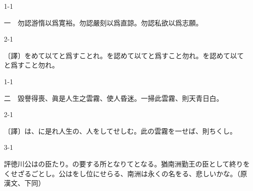 \documentclass[tate,paper=b6j,jafontsize=9pt]{jlreq}
\begin{document}
\thispagestyle{empty}
\vspace*{\fill}
\zw
{}
\vfill
\newpage

\begin{azconvIndented}{1\zw}{-1\zw}

一　勿認游惰以爲寛裕。勿認嚴刻以爲直諒。勿認私欲以爲志願。

\end{azconvIndented}
\begin{azconvIndented}{2\zw}{-1\zw}

〔譯〕をめて以てと爲すことれ。を認めて以てと爲すこと勿れ。を認めて以てと爲すこと勿れ。

\end{azconvIndented}

\begin{azconvIndented}{1\zw}{-1\zw}

二　毀譽得喪、眞是人生之雲霧、使人昏迷。一掃此雲霧、則天青日白。

\end{azconvIndented}
\begin{azconvIndented}{2\zw}{-1\zw}

〔譯〕は、に是れ人生の、人をしてせしむ。此の雲霧を一せば、則ちくし。

\end{azconvIndented}
\begin{azconvIndented}{3\zw}{-1\zw}

評徳川公はの臣たり。の要する所となりてとなる。猶南洲勤王の臣として終りをくせざるごとし。公はをし位にせらる、南洲は永くの名をる、悲しいかな。（原漢文、下同）

\end{azconvIndented}
\end{document}
